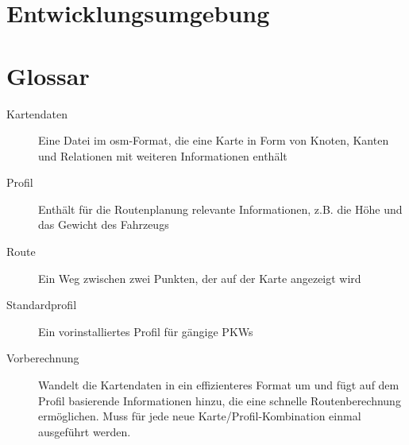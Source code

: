 \documentclass[a4paper, 11pt]{article}
\begin{document}
\section{Entwicklungsumgebung}
\section{Glossar}
\begin{description}
\item[Kartendaten] Eine Datei im osm-Format, die eine Karte in Form von Knoten, Kanten und Relationen mit weiteren Informationen enthält\\
\item[Profil]
Enthält für die Routenplanung relevante Informationen, z.B. die Höhe und das Gewicht des Fahrzeugs\\
\item[Route]
Ein Weg zwischen zwei Punkten, der auf der Karte angezeigt wird\\
\item[Standardprofil]
Ein vorinstalliertes Profil für gängige PKWs\\
\item[Vorberechnung] Wandelt die Kartendaten in ein effizienteres Format um und fügt auf dem Profil basierende Informationen hinzu, die eine schnelle Routenberechnung ermöglichen. Muss für jede neue Karte/Profil-Kombination einmal ausgeführt werden.
\end{description}
\end{document}
